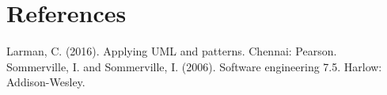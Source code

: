 \documentclass[letterpaper]{article}
\begin{document}

\newpage

\section{References}

    Larman, C. (2016). Applying UML and patterns. Chennai: Pearson.\\
    Sommerville, I. and Sommerville, I. (2006). Software engineering 7.5. Harlow: Addison-Wesley.\\

	
\end{document}
